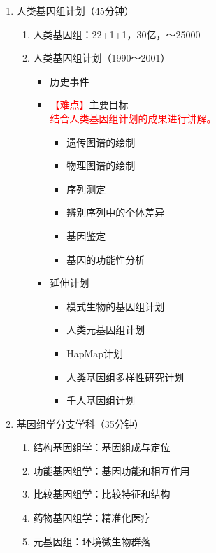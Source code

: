 \documentclass{TIJMUjiaoanLL}
\begin{document}
\begin{enumerate}
  \item 人类基因组计划（45分钟）
    \begin{enumerate}
      \item 人类基因组：22+1+1，30亿，～25000
      \item 人类基因组计划（1990～2001）
        \begin{itemize}
          \item 历史事件
          \item \textcolor{red}{【难点】}主要目标\\
            \textcolor{red}{结合人类基因组计划的成果进行讲解。}
            \begin{itemize}
              \item 遗传图谱的绘制
              \item 物理图谱的绘制
              \item 序列测定
              \item 辨别序列中的个体差异
              \item 基因鉴定
              \item 基因的功能性分析
            \end{itemize}
          \item 延伸计划
            \begin{itemize}
              \item 模式生物的基因组计划
              \item 人类元基因组计划
              \item HapMap计划
              \item 人类基因组多样性研究计划
              \item 千人基因组计划
            \end{itemize}
        \end{itemize}
    \end{enumerate}

  \item 基因组学分支学科（35分钟）
    \begin{enumerate}
      \item 结构基因组学：基因组成与定位
      \item 功能基因组学：基因功能和相互作用
      \item 比较基因组学：比较特征和结构
      \item 药物基因组学：精准化医疗
      \item 元基因组：环境微生物群落
    \end{enumerate}


\end{enumerate}
\end{document}
